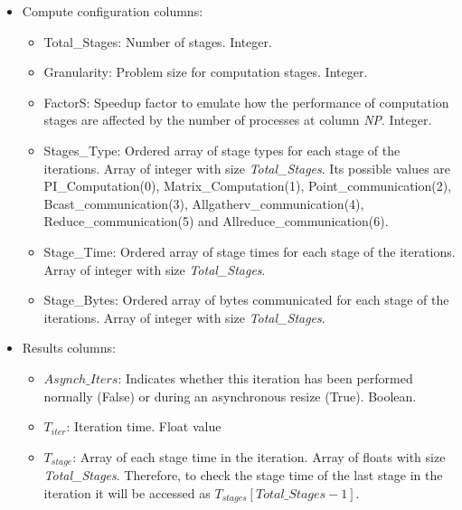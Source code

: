 \begin{itemize}
    \item Compute configuration columns:
    \begin{itemize}
        \item Total\_Stages: Number of stages. Integer.
        \item Granularity: Problem size for computation stages. Integer.
        \item FactorS: Speedup factor to emulate how the performance of computation stages are affected by the number of processes at column \textit{NP}. Integer.
        \item Stages\_Type: Ordered array of stage types for each stage of the iterations. Array of integer with size \textit{Total\_Stages}. Its possible values are PI\_Computation(0), Matrix\_Computation(1), Point\_communication(2), Bcast\_communication(3), Allgatherv\_communication(4), Reduce\_communication(5) and Allreduce\_communication(6).
        \item Stage\_Time: Ordered array of stage times for each stage of the iterations. Array of integer with size \textit{Total\_Stages}.
        \item Stage\_Bytes: Ordered array of bytes communicated for each stage of the iterations. Array of integer with size \textit{Total\_Stages}.
    \end{itemize}
    
    \item Results columns:
    \begin{itemize}
        \item $Asynch\_Iters$: Indicates whether this iteration has been performed normally (False) or during an asynchronous resize (True). Boolean.
        \item $T_{iter}$: Iteration time. Float value
        \item $T_{stage}$: Array of each stage time in the iteration. Array of floats with size \textit{Total\_Stages}. Therefore, to check the stage time of the last stage in the iteration it will be accessed as $T_{stages}[Total\_Stages-1]$.
    \end{itemize}
\end{itemize}